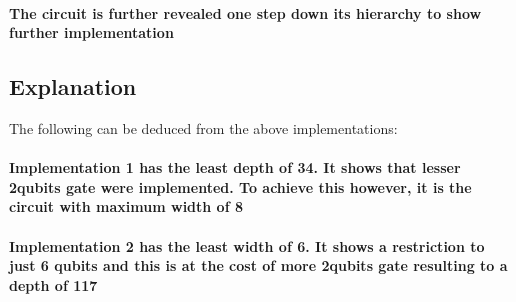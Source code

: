 \documentclass[12pt, letterpaper]{article}
\begin{document}
\paragraph{
The circuit is further revealed one step down its hierarchy to show further implementation
}


\newpage
\subsection{
Explanation
}
The following can be deduced from the above implementations:
\paragraph{
Implementation 1 has the least depth of 34. It shows that lesser 2qubits gate were implemented. To achieve this however, it is the circuit with maximum width of 8}
\paragraph{
Implementation 2 has the least width of 6. It shows a restriction to just 6 qubits and this is at the cost of more 2qubits gate resulting to a depth of 117}
\end{document}
